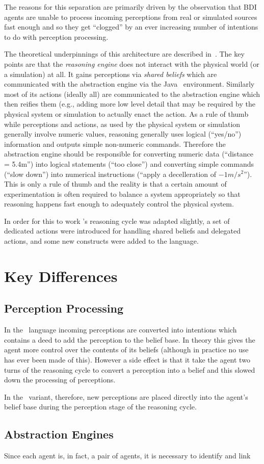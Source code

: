 \documentclass[a4]{article}
\begin{document}
The reasons for this separation are primarily driven by the observation that BDI agents are unable to process incoming perceptions from real or simulated sources fast enough and so they get ``clogged'' by an ever increasing number of intentions to do with perception processing.  

The theoretical underpinnings of this architecture are described in~\cite{DALT10:abstraction}.  The key points are that the \emph{reasoning engine} does not interact with the physical world (or a simulation) at all.  It gains perceptions via \emph{shared beliefs} which are communicated with the abstraction engine via the Java \eass\ environment.  Similarly most of its actions (ideally all) are communicated to the abstraction engine which then reifies them (e.g., adding more low level detail that may be required by the physical system or simulation to actually enact the action.  As a rule of thumb while perceptions and actions, as used by the physical system or simulation generally involve numeric values, reasoning generally uses logical (``yes/no'') information and outputs simple non-numeric commands.  Therefore the abstraction engine should be responsible for converting numeric data (``distance = 5.4m'') into logical statements (``too close'') and converting simple commands (``slow down'') into numerical instructions (``apply a decelleration of $-1m/s^2$'').  This is only a rule of thumb and the reality is that a certain amount of experimentation is often required to balance a system appropriately so that reasoning happens fast enough to adequately control the physical system.

In order for this to work \gwendolen's reasoning cycle was adapted slightly, a set of dedicated actions were introduced for handling shared beliefs and delegated actions, and some new constructs were added to the language.

\section{Key Differences}
\subsection{Perception Processing}
In the \gwendolen\ language incoming perceptions are converted into intentions which contains a deed to add the perception to the belief base.  In theory this gives the agent more control over the contents of its beliefs (although in practice no use has ever been made of this).  However a side effect is that it take the agent two turns of the reasoning cycle to convert a perception into a belief and this slowed down the processing of perceptions.

In the \eass\ variant, therefore, new perceptions are placed directly into the agent's belief base during the perception stage of the reasoning cycle.

\subsection{Abstraction Engines}
Since each agent is, in fact, a pair of agents, it is necessary to identify and link 



\end{document}
